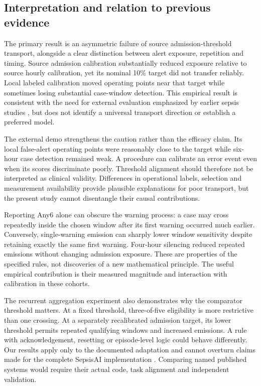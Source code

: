\documentclass[preprint,12pt]{elsarticle}
\newcommand{\anysix}{Any6}
\begin{document}
\subsection{Interpretation and relation to previous evidence}
The primary result is an asymmetric failure of source admission-threshold transport, alongside a clear distinction between alert exposure, repetition and timing. Source admission calibration substantially reduced exposure relative to source hourly calibration, yet its nominal 10\% target did not transfer reliably. Local labeled calibration moved operating points near that target while sometimes losing substantial case-window detection. This empirical result is consistent with the need for external evaluation emphasized by earlier sepsis studies \cite{wong,moor,rockenschaub}, but does not identify a universal transport direction or establish a preferred model.

The external demo strengthens the caution rather than the efficacy claim. Its local false-alert operating points were reasonably close to the target while six-hour case detection remained weak. A procedure can calibrate an error event even when its scores discriminate poorly. Threshold alignment should therefore not be interpreted as clinical validity. Differences in operational labels, selection and measurement availability provide plausible explanations for poor transport, but the present study cannot disentangle their causal contributions.

Reporting \anysix{} alone can obscure the warning process: a case may cross repeatedly inside the chosen window after its first warning occurred much earlier. Conversely, single-warning emission can sharply lower window sensitivity despite retaining exactly the same first warning. Four-hour silencing reduced repeated emissions without changing admission exposure. These are properties of the specified rules, not discoveries of a new mathematical principle. The useful empirical contribution is their measured magnitude and interaction with calibration in these cohorts.

The recurrent aggregation experiment also demonstrates why the comparator threshold matters. At a fixed threshold, three-of-five eligibility is more restrictive than one crossing. At a separately recalibrated admission target, its lower threshold permits repeated qualifying windows and increased emissions. A rule with acknowledgement, resetting or episode-level logic could behave differently. Our results apply only to the documented adaptation and cannot overturn claims made for the complete SepsisAI implementation \cite{gupta}. Comparing named published systems would require their actual code, task alignment and independent validation.
\end{document}
